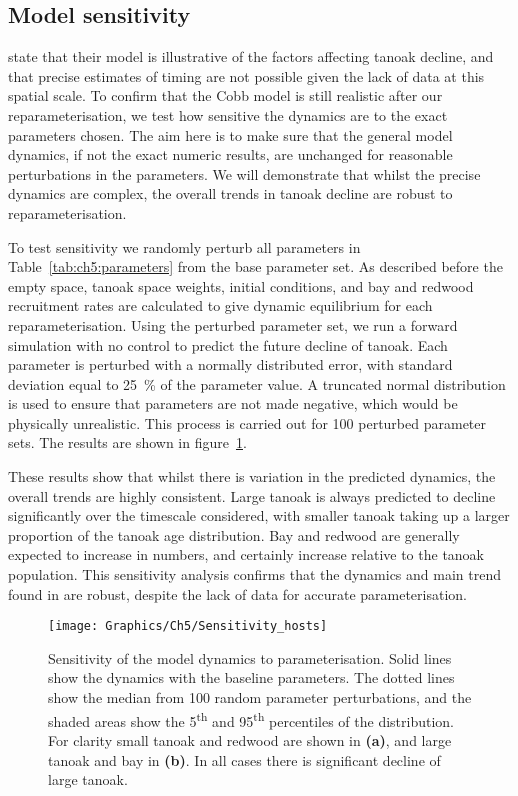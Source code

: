 \subsection{Model sensitivity\label{sec:ch5:model_sensitivity}}

\citet{cobb_ecosystem_2012} state that their model is illustrative of the factors affecting tanoak decline, and that precise estimates of timing are not possible given the lack of data at this spatial scale. To confirm that the Cobb model is still realistic after our reparameterisation, we test how sensitive the dynamics are to the exact parameters chosen. The aim here is to make sure that the general model dynamics, if not the exact numeric results, are unchanged for reasonable perturbations in the parameters. We will demonstrate that whilst the precise dynamics are complex, the overall trends in tanoak decline are robust to reparameterisation.

To test sensitivity we randomly perturb all parameters in Table~\ref{tab:ch5:parameters} from the base parameter set. As described before the empty space, tanoak space weights, initial conditions, and bay and redwood recruitment rates are calculated to give dynamic equilibrium for each reparameterisation. Using the perturbed parameter set, we run a forward simulation with no control to predict the future decline of tanoak. Each parameter is perturbed with a normally distributed error, with standard deviation equal to \SI{25}{\percent} of the parameter value. A truncated normal distribution is used to ensure that parameters are not made negative, which would be physically unrealistic. This process is carried out for 100 perturbed parameter sets. The results are shown in figure~\ref{fig:ch5:model_sensitivity}.

These results show that whilst there is variation in the predicted dynamics, the overall trends are highly consistent. Large tanoak is always predicted to decline significantly over the timescale considered, with smaller tanoak taking up a larger proportion of the tanoak age distribution. Bay and redwood are generally expected to increase in numbers, and certainly increase relative to the tanoak population. This sensitivity analysis confirms that the dynamics and main trend found in \citet{cobb_ecosystem_2012} are robust, despite the lack of data for accurate parameterisation.

\begin{figure}[b]
    \begin{center}
        \texttt{[image: Graphics/Ch5/Sensitivity\_hosts]}
        \caption[Sensitivity of model dynamics]{Sensitivity of the model dynamics to parameterisation. Solid lines show the dynamics with the baseline parameters. The dotted lines show the median from 100 random parameter perturbations, and the shaded areas show the 5\textsuperscript{th} and 95\textsuperscript{th} percentiles of the distribution. For clarity small tanoak and redwood are shown in \textbf{(a)}, and large tanoak and bay in \textbf{(b)}. In all cases there is significant decline of large tanoak.\label{fig:ch5:model_sensitivity}}
    \end{center}
\end{figure}
\FloatBarrier{}

